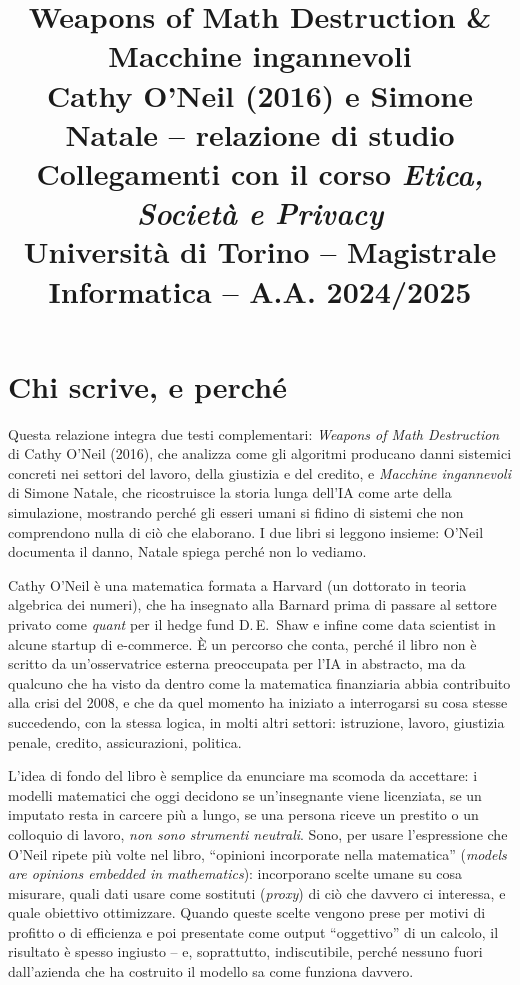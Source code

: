 \documentclass[a4paper,11pt]{article}
\title{\textbf{Weapons of Math Destruction} \& \textbf{Macchine ingannevoli}\\[0.3em]
\large Cathy O'Neil (2016) e Simone Natale -- relazione di studio\\[0.3em]
\normalsize Collegamenti con il corso \emph{Etica, Società e Privacy}\\
Università di Torino -- Magistrale Informatica -- A.A. 2024/2025}
\author{}
\date{}
\begin{document}
\maketitle
\tableofcontents
\newpage

\section{Chi scrive, e perché}

Questa relazione integra due testi complementari: \emph{Weapons of Math Destruction} di Cathy O'Neil (2016), che analizza come gli algoritmi producano danni sistemici concreti nei settori del lavoro, della giustizia e del credito, e \emph{Macchine ingannevoli} di Simone Natale, che ricostruisce la storia lunga dell'IA come arte della simulazione, mostrando perché gli esseri umani si fidino di sistemi che non comprendono nulla di ciò che elaborano. I due libri si leggono insieme: O'Neil documenta il danno, Natale spiega perché non lo vediamo.

Cathy O'Neil è una matematica formata a Harvard (un dottorato in teoria algebrica dei numeri), che ha insegnato alla Barnard prima di passare al settore privato come \emph{quant} per il hedge fund D.\,E.\ Shaw e infine come data scientist in alcune startup di e-commerce. È un percorso che conta, perché il libro non è scritto da un'osservatrice esterna preoccupata per l'IA in abstracto, ma da qualcuno che ha visto da dentro come la matematica finanziaria abbia contribuito alla crisi del 2008, e che da quel momento ha iniziato a interrogarsi su cosa stesse succedendo, con la stessa logica, in molti altri settori: istruzione, lavoro, giustizia penale, credito, assicurazioni, politica.

L'idea di fondo del libro è semplice da enunciare ma scomoda da accettare: i modelli matematici che oggi decidono se un'insegnante viene licenziata, se un imputato resta in carcere più a lungo, se una persona riceve un prestito o un colloquio di lavoro, \emph{non sono strumenti neutrali}. Sono, per usare l'espressione che O'Neil ripete più volte nel libro, ``opinioni incorporate nella matematica'' (\emph{models are opinions embedded in mathematics}): incorporano scelte umane su cosa misurare, quali dati usare come sostituti (\emph{proxy}) di ciò che davvero ci interessa, e quale obiettivo ottimizzare. Quando queste scelte vengono prese per motivi di profitto o di efficienza e poi presentate come output ``oggettivo'' di un calcolo, il risultato è spesso ingiusto -- e, soprattutto, indiscutibile, perché nessuno fuori dall'azienda che ha costruito il modello sa come funziona davvero.
\end{document}
